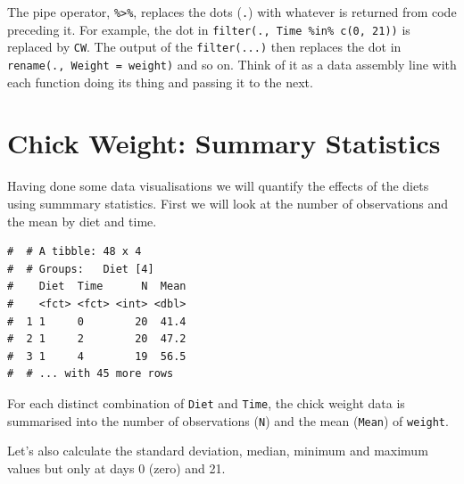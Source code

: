 \documentclass[a4paper,9pt,twocolumn,twoside,printwatermark=false]{pinp}
\begin{document}
The pipe operator, \texttt{\%\textgreater{}\%}, replaces the dots
(\texttt{.}) with whatever is returned from code preceding it. For
example, the dot in \texttt{filter(.,\ Time\ \%in\%\ c(0,\ 21))} is
replaced by \texttt{CW}. The output of the \texttt{filter(...)} then
replaces the dot in \texttt{rename(.,\ Weight\ =\ weight)} and so on.
Think of it as a data assembly line with each function doing its thing
and passing it to the next.

\section{Chick Weight: Summary
Statistics}\label{chick-weight-summary-statistics}

Having done some data visualisations we will quantify the effects of the
diets using summmary statistics. First we will look at the number of
observations and the mean by diet and time.

\begin{Shaded}
\end{Shaded}

\begin{ShadedResult}
\begin{verbatim}
#  # A tibble: 48 x 4
#  # Groups:   Diet [4]
#    Diet  Time      N  Mean
#    <fct> <fct> <int> <dbl>
#  1 1     0        20  41.4
#  2 1     2        20  47.2
#  3 1     4        19  56.5
#  # ... with 45 more rows
\end{verbatim}
\end{ShadedResult}

For each distinct combination of \texttt{Diet} and \texttt{Time}, the
chick weight data is summarised into the number of observations
(\texttt{N}) and the mean (\texttt{Mean}) of \texttt{weight}.

Let's also calculate the standard deviation, median, minimum and maximum
values but only at days 0 (zero) and 21.
\end{document}
